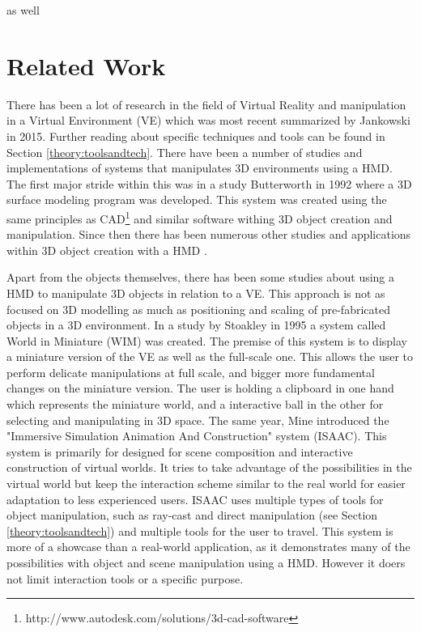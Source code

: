 as well\chapter{Related Work}
\label{relatedwork}
There has been a lot of research in the field of Virtual Reality and manipulation in a Virtual Environment (VE) which was most recent summarized by Jankowski in 2015\cite{interactions:Jankowski2015}. Further reading about specific techniques and tools can be found in Section \ref{theory:toolsandtech}. There have been a number of studies and implementations of systems that manipulates 3D environments using a HMD. The first major stride within this was in a study Butterworth in 1992 where a 3D surface modeling program was developed\cite{relatedwork:Butterworth1992}. This system was created using the same principles as CAD\footnote{http://www.autodesk.com/solutions/3d-cad-software} and similar software withing 3D object creation and manipulation. Since then there has been numerous other studies and applications within 3D object creation with a HMD\cite{relatedwork:bowman1996conceptual} \cite{relatedwork:moshell1995research} \cite{relatedwork:liang1994jdcad}.

Apart from the objects themselves, there has been some studies about using a HMD to manipulate 3D objects in relation to a VE. This approach is not as focused on 3D modelling as much as positioning and scaling of pre-fabricated objects in a 3D environment. In a study by Stoakley in 1995 a system called World in Miniature (WIM) was created\cite{relatedwork:stoakley1995virtual}. The premise of this system is to display a miniature version of the VE as well as the full-scale one. This allows the user to perform delicate manipulations at full scale, and bigger more fundamental changes on the miniature version. The user is holding a clipboard in one hand which represents the miniature world, and a interactive ball in the other for selecting and manipulating in 3D space. The same year, Mine introduced the "Immersive Simulation
Animation And Construction" system (ISAAC)\cite{relatedwork:mine1995isaac}. This system is primarily for designed for scene composition and interactive construction of virtual worlds. It tries to take advantage of the possibilities in the virtual world but keep the interaction scheme similar to the real world for easier adaptation to less experienced users. ISAAC uses multiple types of tools for object manipulation, such as ray-cast and direct manipulation (see Section \ref{theory:toolsandtech}) and multiple tools for the user to travel. This system is more of a showcase than a real-world application, as it demonstrates many of the possibilities with object and scene manipulation using a HMD. However it doers not limit interaction tools or a specific purpose.

